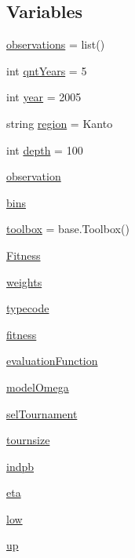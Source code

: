 \subsection*{Variables}
\begin{DoxyCompactItemize}
\item 
\hyperlink{namespacecode_1_1first_try_a04485db90412d9c5a588b7a5d6668f0c}{observations} = list()
\item 
int \hyperlink{namespacecode_1_1first_try_a7fd101b7df63e2aff55d15518c3dd587}{qnt\+Years} = 5
\item 
int \hyperlink{namespacecode_1_1first_try_aaa285209df845cddc4378d35e19ecc54}{year} = 2005
\item 
string \hyperlink{namespacecode_1_1first_try_a55a54b51227afc77253859ddda04e28f}{region} = \textquotesingle{}Kanto\textquotesingle{}
\item 
int \hyperlink{namespacecode_1_1first_try_a09aa59991482f93e58d6df9df2be3e1d}{depth} = 100
\item 
\hyperlink{namespacecode_1_1first_try_a1f2c1572d59cd6e3794359fd1e0665df}{observation}
\item 
\hyperlink{namespacecode_1_1first_try_ada753ecdb895175d831311edaa73880e}{bins}
\item 
\hyperlink{namespacecode_1_1first_try_a0d3a31e91f83f2a717cd4795ad401adf}{toolbox} = base.\+Toolbox()
\item 
\hyperlink{namespacecode_1_1first_try_af1e640c431f95677df144b30acd32edd}{Fitness}
\item 
\hyperlink{namespacecode_1_1first_try_ada94da715124ea92f65b32c5c323ffa6}{weights}
\item 
\hyperlink{namespacecode_1_1first_try_a9a05c81aeac92b32573a403e7f70cd14}{typecode}
\item 
\hyperlink{namespacecode_1_1first_try_a02a97e3bfa9a8a63fbb2db09b80b9460}{fitness}
\item 
\hyperlink{namespacecode_1_1first_try_a36a48fcdb35d6b3453408113e1ba7314}{evaluation\+Function}
\item 
\hyperlink{namespacecode_1_1first_try_a461ee0676d457c2365142f11ebf83368}{model\+Omega}
\item 
\hyperlink{namespacecode_1_1first_try_a3bd1c3377b5ed8e44f6643a9bb5ce782}{sel\+Tournament}
\item 
\hyperlink{namespacecode_1_1first_try_aa92188de7bc8afd36d55f621ebe57e30}{tournsize}
\item 
\hyperlink{namespacecode_1_1first_try_aa542c95e1c8c4adad53be28f37081e14}{indpb}
\item 
\hyperlink{namespacecode_1_1first_try_a31c6f37986ac9c471793d81aac95d430}{eta}
\item 
\hyperlink{namespacecode_1_1first_try_aca347cd73ae40d8db2d8eefce2a1598b}{low}
\item 
\hyperlink{namespacecode_1_1first_try_a829800c0f197bc02b4b0883ca2f38784}{up}
\end{DoxyCompactItemize}


